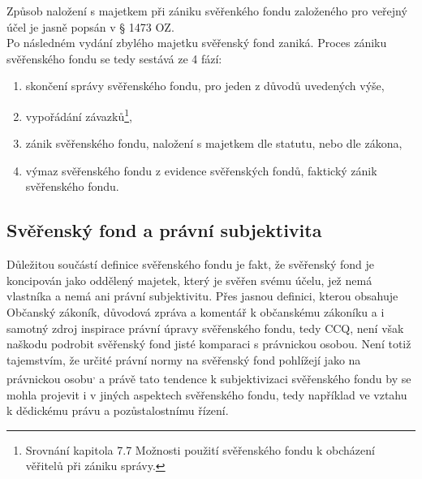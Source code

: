 \documentclass{article}
\begin{document}
Způsob naložení s majetkem při zániku svěřenkého fondu založeného pro veřejný účel je jasně popsán v § 1473 OZ.\\

Po následném vydání zbylého majetku svěřenský fond zaniká. Proces zániku svěřenského fondu se tedy sestává ze 4 fází:\\

\begin{enumerate}
\item skončení správy svěřenského fondu, pro jeden z důvodů uvedených výše,
\item vypořádání závazků\footnote{Srovnání kapitola 7.7 Možnosti použití svěřenského fondu k obcházení věřitelů při zániku správy.},
\item zánik svěřenského fondu, naložení s majetkem dle statutu, nebo dle zákona,
\item výmaz svěřenského fondu z evidence svěřenských fondů, faktický zánik svěřenského fondu.	
\end{enumerate}


\subsection{Svěřenský fond a právní subjektivita}





Důležitou součástí definice svěřenského fondu je fakt, že svěřenský fond je koncipován jako oddělený majetek, který je svěřen svému účelu, jež nemá vlastníka a nemá ani právní subjektivitu. Přes jasnou definici, kterou obsahuje Občanský zákoník, důvodová zpráva a komentář k občanskému zákoníku a i samotný zdroj inspirace právní úpravy svěřenského fondu, tedy CCQ, není však naškodu podrobit svěřenský fond jisté komparaci s právnickou osobou. Není totiž tajemstvím, že určité právní normy na svěřenský fond pohlížejí jako na právnickou osobu\textsuperscript{,} a právě tato tendence k subjektivizaci svěřenského fondu by se mohla projevit i v jiných aspektech svěřenského fondu, tedy například ve vztahu k dědickému právu a pozůstalostnímu řízení. \\
\end{document}
